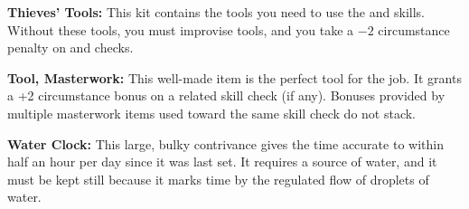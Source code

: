 \textbf{Thieves' Tools:} This kit contains the tools you need to use the  and  skills. Without these tools, you must improvise tools, and you take a $-2$ circumstance penalty on  and  checks.

\textbf{Tool, Masterwork:} This well-made item is the perfect tool for the job. It grants a +2 circumstance bonus on a related skill check (if any). Bonuses provided by multiple masterwork items used toward the same skill check do not stack.

\textbf{Water Clock:} This large, bulky contrivance gives the time accurate to within half an hour per day since it was last set. It requires a source of water, and it must be kept still because it marks time by the regulated flow of droplets of water.